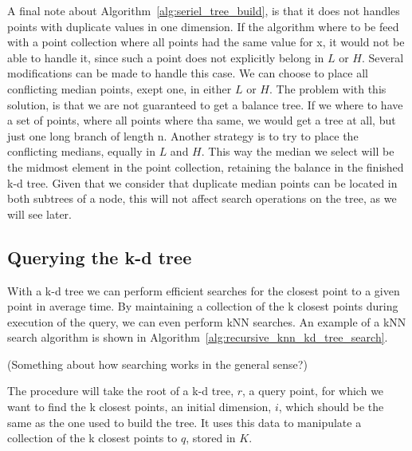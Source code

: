 A final note about Algorithm~\ref{alg:seriel_tree_build}, is that it does not handles points with duplicate values in one dimension. If the algorithm where to be feed with a point collection where all points had the same value for x, it would not be able to handle it, since such a point does not explicitly belong in $L$ or $H$. Several modifications can be made to handle this case. We can choose to place all conflicting median points, exept one, in either $L$ or $H$. The problem with this solution, is that we are not guaranteed to get a balance tree. If we where to have a set of points, where all points where tha same, we would get a tree at all, but just one long branch of length n. Another strategy is to try to place the conflicting medians, equally in $L$ and $H$. This way the median we select will be the midmost element in the point collection, retaining the balance in the finished k-d tree. Given that we consider that duplicate median points can be located in both subtrees of a node, this will not affect search operations on the tree, as we will see later.

\subsection{Querying the k-d tree} %
\label{sub:querying_the_k_d_tree}

With a k-d tree we can perform efficient searches for the closest point to a given point in  average time\cite{Friedman:1977}. By maintaining a collection of the k closest points during execution of the query, we can even perform kNN searches. An example of a kNN search algorithm is shown in Algorithm~\ref{alg:recursive_knn_kd_tree_search}.

(Something about how searching works in the general sense?)

The procedure will take the root of a k-d tree, $r$, a query point, for which we want to find the k closest points, an initial dimension, $i$, which should be the same as the one used to build the tree. It uses this data to manipulate a collection of the k closest points to $q$, stored in $K$.

